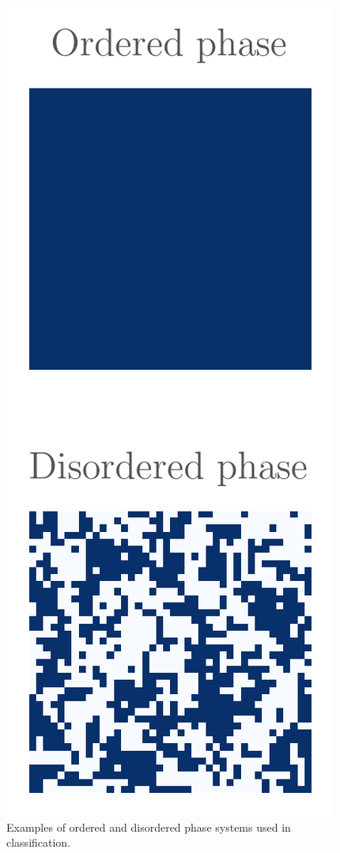 \begin{figure}
  \centering
  \includegraphics[]{figures/matrix.png}
  \caption{\label{fig:matrix} Examples of ordered and disordered phase systems
    used in classification.}
\end{figure}

